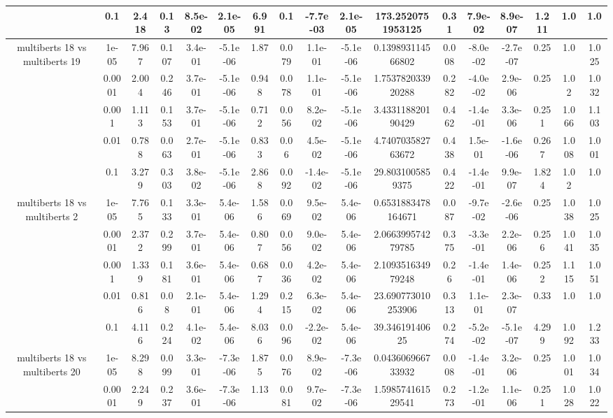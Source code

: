 \begin{tabular}{|c|c|c|c|c|c|c|c|c|c|c|c|c|c|c|c|c|}
 & 0.1 & 2.418 & 0.13 & 8.5e-02 & 2.1e-05 & 6.991 & 0.1 & -7.7e-03 & 2.1e-05 & 173.2520751953125 & 0.31 & 7.9e-02 & 8.9e-07 & 1.211 & 1.0 & 1.0 \\
\hline
\multirow{5}{*}{multiberts 18 vs multiberts 19} & 1e-05 & 7.967 & 0.107 & 3.4e-01 & -5.1e-06 & 1.87 & 0.079 & 1.1e-01 & -5.1e-06 & 0.139893114566802 & 0.008 & -8.0e-02 & -2.7e-07 & 0.25 & 1.0 & 1.025 \\
 & 0.0001 & 2.004 & 0.246 & 3.7e-01 & -5.1e-06 & 0.948 & 0.078 & 1.1e-01 & -5.1e-06 & 1.753782033920288 & 0.282 & -4.0e-02 & 2.9e-06 & 0.25 & 1.02 & 1.032 \\
 & 0.001 & 1.113 & 0.153 & 3.7e-01 & -5.1e-06 & 0.712 & 0.056 & 8.2e-02 & -5.1e-06 & 3.433118820190429 & 0.462 & -1.4e-01 & 3.3e-06 & 0.251 & 1.066 & 1.103 \\
 & 0.01 & 0.788 & 0.063 & 2.7e-01 & -5.1e-06 & 0.833 & 0.06 & 4.5e-02 & -5.1e-06 & 4.740703582763672 & 0.438 & 1.5e-01 & -1.6e-06 & 0.267 & 1.008 & 1.001 \\
 & 0.1 & 3.279 & 0.303 & 3.8e-02 & -5.1e-06 & 2.868 & 0.092 & -1.4e-02 & -5.1e-06 & 29.8031005859375 & 0.422 & -1.4e-01 & 9.9e-07 & 1.824 & 1.02 & 1.0 \\
\hline
\multirow{5}{*}{multiberts 18 vs multiberts 2} & 1e-05 & 7.765 & 0.133 & 3.3e-01 & 5.4e-06 & 1.586 & 0.069 & 9.5e-02 & 5.4e-06 & 0.6531883478164671 & 0.087 & -9.7e-02 & -2.6e-06 & 0.25 & 1.038 & 1.025 \\
 & 0.0001 & 2.372 & 0.299 & 3.7e-01 & 5.4e-06 & 0.807 & 0.056 & 9.0e-02 & 5.4e-06 & 2.066399574279785 & 0.375 & -3.3e-01 & 2.2e-06 & 0.256 & 1.041 & 1.035 \\
 & 0.001 & 1.339 & 0.181 & 3.6e-01 & 5.4e-06 & 0.687 & 0.036 & 4.2e-02 & 5.4e-06 & 2.109351634979248 & 0.26 & -1.4e-01 & 1.4e-06 & 0.252 & 1.115 & 1.051 \\
 & 0.01 & 0.816 & 0.08 & 2.1e-01 & 5.4e-06 & 1.294 & 0.215 & 6.3e-02 & 5.4e-06 & 23.690773010253906 & 0.313 & 1.1e-01 & 2.3e-07 & 0.33 & 1.0 & 1.0 \\
 & 0.1 & 4.116 & 0.224 & 4.1e-02 & 5.4e-06 & 8.036 & 0.096 & -2.2e-02 & 5.4e-06 & 39.34619140625 & 0.274 & -5.2e-02 & -5.1e-07 & 4.299 & 1.092 & 1.233 \\
\hline
\multirow{5}{*}{multiberts 18 vs multiberts 20} & 1e-05 & 8.298 & 0.099 & 3.3e-01 & -7.3e-06 & 1.875 & 0.076 & 8.9e-02 & -7.3e-06 & 0.043606966733932 & 0.008 & -1.4e-01 & 3.2e-06 & 0.25 & 1.001 & 1.034 \\
 & 0.0001 & 2.249 & 0.237 & 3.6e-01 & -7.3e-06 & 1.13 & 0.081 & 9.7e-02 & -7.3e-06 & 1.598574161529541 & 0.273 & -1.2e-01 & 1.1e-06 & 0.251 & 1.028 & 1.022 \\

\end{tabular}
